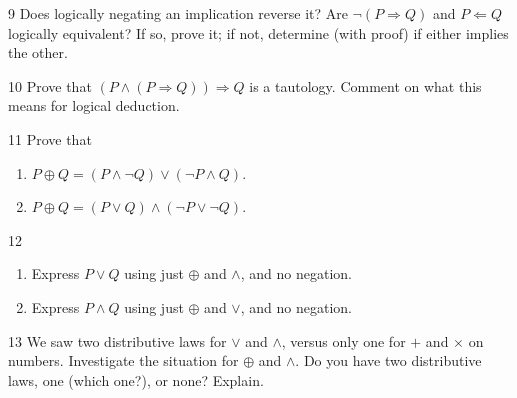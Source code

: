 \begin{exercise}{9}
    Does logically negating an implication reverse it? Are
    $\neg(P\Rightarrow Q)$ and $P\Leftarrow Q$ logically equivalent? If so, prove
    it; if not, determine (with proof) if either implies the other.
\end{exercise}

\begin{exercise}{10}
    Prove that $(P\wedge(P\Rightarrow Q))\Rightarrow Q$ is a tautology. Comment
    on what this means for logical deduction.
\end{exercise}

\begin{exercise}{11}
    Prove that
    \begin{enumerate}[label=(\alph*)]
        \item $P\oplus Q=(P\wedge\neg Q)\vee(\neg P\wedge Q)$.
        \item $P\oplus Q=(P\vee Q)\wedge(\neg P\vee\neg Q)$.
    \end{enumerate}
\end{exercise}

\begin{exercise}{12}
    \begin{enumerate}[label=(\alph*)]
        \item Express $P\vee Q$ using just $\oplus$ and $\wedge$, and no negation.
        \item Express $P\wedge Q$ using just $\oplus$ and $\vee$, and no negation.
    \end{enumerate}
\end{exercise}

\begin{exercise}{13}
    We saw two distributive laws for $\vee$ and $\wedge$, versus only one for $+$
    and $\times$ on numbers. Investigate the situation for $\oplus$ and $\wedge$.
    Do you have two distributive laws, one (which one?), or none? Explain.
\end{exercise}

